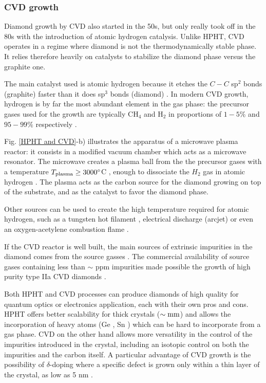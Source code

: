 \documentclass[a4paper, 11pt]{report}
\begin{document}
\subsubsection{CVD growth}
\label{fab HPHT}

Diamond growth by CVD also started in the 50s, but only really took off in the 80s \citep{matsumoto1982growth, matsumoto1982vapor, kamo1983diamond} with the introduction of atomic hydrogen catalysis. Unlike HPHT, CVD operates in a regime where diamond is not the thermodynamically stable phase. It relies therefore heavily on catalysts to stabilize the diamond phase versus the graphite one. 

The main catalyst used is atomic hydrogen because it etches the $C-C$ sp$^2$ bonds (graphite) faster than it does sp$^3$ bonds (diamond) \citep{gracio2010diamond}. In modern CVD growth, hydrogen is by far the most abundant element in the gas phase: the precursor gases used for the growth are typically CH$_4$ and H$_2$ in proportions of $1-5\%$ and $95-99\%$ respectively \citep{achard2020chemical}.

Fig. \ref{HPHT and CVD}-b) illustrates the apparatus of a microwave plasma reactor: it consists in a modified vacuum chamber which acts as a microwave resonator. The microwave creates a plasma ball from the the precursor gases with a temperature $T_{\rm plasma} \geq 3000 ^\circ$C \citep{ashfold2020nitrogen}, enough to dissociate the $H_2$ gas in atomic hydrogen \citep{balmer2009chemical}. The plasma acts as the carbon source for the diamond growing on top of the substrate, and as the catalyst to favor the diamond phase. %

Other sources can be used to create the high temperature required for atomic hydrogen, such as a tungsten hot filament \citep{haubner1993diamond}, electrical discharge (arcjet) \citep{luque1998excited} or even an oxygen-acetylene combustion flame \citep{bachmann1991towards}.

If the CVD reactor is well built, the main sources of extrinsic impurities in the diamond comes from the source gasses \citep{balmer2009chemical}. The commercial availability of source gases containing less than $\sim$ ppm impurities made possible the growth of  high purity type IIa CVD diamonds \citep{kasu2003high, twitchen2004high, tallaire2006characterisation}.

\medskip
Both HPHT and CVD processes can produce diamonds of high quality for quantum optics or electronics application, each with their own pros and cons. HPHT offers better scalability for thick crystals ($\sim \rm mm$) and allows the incorporation of heavy atoms (Ge \citep{palyanov2015germanium} , Sn \citep{ekimov2019effect}) which can be hard to incorporate from a gas phase. CVD on the other hand allows more versatility in the control of the impurities introduced in the crystal, including an isotopic control on both the impurities and the carbon itself. A particular advantage of CVD growth is the possibility of $\delta$-doping where a specific defect is grown only within a thin layer of the crystal, as low as 5 nm \citep{ohno2012engineering, ishikawa2012optical, ohashi2013negatively}.
\end{document}
